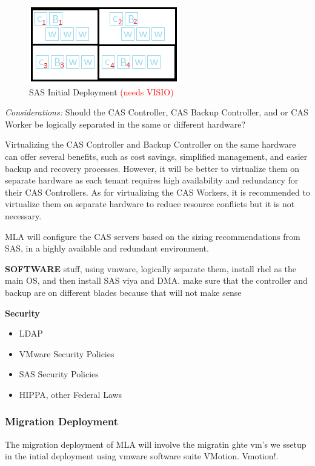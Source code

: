 \begin{figure}[H]
    \centering
    \includegraphics[scale = 1]{images/sas-initial-deployment.png}
    \caption{SAS Initial Deployment \textcolor{red}{(needs VISIO)} }
    \label{SAS Initial Deployment}
\end{figure}

\emph{Considerations:} Should the CAS Controller, CAS Backup Controller, and or CAS Worker be logically separated in the same or different hardware? 

Virtualizing the CAS Controller and Backup Controller on the same hardware can offer several benefits, such as cost savings, simplified management, and easier backup and recovery processes. However, it will be better to virtualize them on separate hardware as each tenant requires high availability and redundancy for their CAS Controllers. As for virtualizing the CAS Workers, it is recommended to virtualize them on separate hardware to reduce resource conflicts but it is not necessary. 

MLA will configure the CAS servers based on the sizing recommendations from SAS, in a highly available and redundant environment. 

\textbf{SOFTWARE}
stuff, using vmware, logically separate them, install rhel as the main OS, and then install SAS viya and DMA. make sure that the controller and backup are on different blades because that will not make sense 

\textbf{Security}
\begin{itemize}
    \item LDAP
    \item VMware Security Policies
    \item SAS Security Policies
    \item HIPPA, other Federal Laws
\end{itemize}

\textbf{}

\subsubsection{Migration Deployment}
The migration deployment of MLA will involve the migratin ghte vm's we ssetup in the intial deployment using vmware software suite VMotion. Vmotion!.

